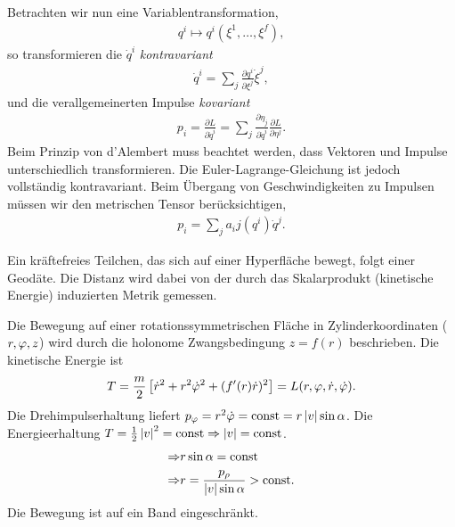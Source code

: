 Betrachten wir nun eine Variablentransformation,
\begin{align*}
q^i \mapsto q^i(\xi^1, \ldots, \xi^f),
\end{align*}
so transformieren die $\dot{q}^i$ \emph{kontravariant}
\begin{align*}
\dot{q}^i = \sum_j \frac{\partial q^i}{\partial \xi^j}\dot{\xi}^j,
\end{align*}
und die verallgemeinerten Impulse \emph{kovariant}
\begin{align*}
p_i = \frac{\partial L}{\partial \dot{q}^i} = \sum_j \frac{\partial
\eta_j}{\partial \dot{q}^i}\frac{\partial L}{\partial \eta^j}.
\end{align*}
Beim Prinzip von d'Alembert muss beachtet werden, dass 
Vektoren und Impulse unterschiedlich transformieren.
Die Euler-Lagrange-Gleichung ist jedoch vollständig kontravariant. Beim
Übergang von Geschwindigkeiten zu Impulsen müssen wir den metrischen Tensor
berücksichtigen,
\begin{align*}
p_i = \sum\limits_j a_ij(q^i)\dot{q}^j.
\end{align*}

\begin{bemn}
Ein kräftefreies Teilchen, das sich auf einer Hyperfläche bewegt, folgt einer
Geodäte. Die Distanz wird dabei von der durch das Skalarprodukt (kinetische
Energie) induzierten Metrik gemessen.\maphere
\end{bemn}

\begin{bsp}
Die Bewegung auf einer rotationssymmetrischen Fläche in Zylinderkoordinaten
($r,\varphi,z$) wird durch die holonome Zwangsbedingung $z=f(r)$ beschrieben. Die
kinetische Energie ist
\begin{align*}
T = \frac{m}{2}\left[\dot{r}^2 + r^2\dot{\varphi}^2 + (f'(r)\dot{r})^2\right] =
L(r,\varphi,\dot{r},\dot{\varphi}).
\end{align*}
Die Drehimpulserhaltung liefert $p_\varphi = r^2\dot{\varphi} = \mathrm{const} =
r\left|v\right|\sin\alpha$. Die Energieerhaltung $T=\frac{1}{2}\left|v\right|^2 = \mathrm{const}
\Rightarrow \left|v\right|  = \mathrm{const}$.
\begin{align*}
\Rightarrow &r \sin\alpha = \mathrm{const}\\
\Rightarrow &r = \frac{p_\rho}{\left|v\right| \sin\alpha} > \mathrm{const}. 
\end{align*}
Die Bewegung ist auf ein Band eingeschränkt.\bsphere
\end{bsp}